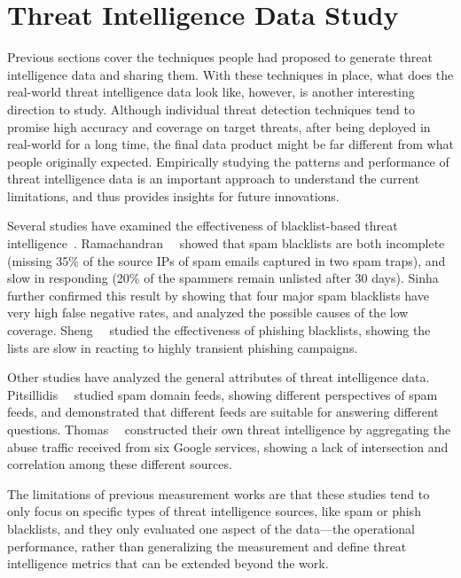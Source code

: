 \section{Threat Intelligence Data Study}
\label{sec:threat_intel_data}

Previous sections cover the techniques people had proposed to generate
threat intelligence data and sharing them. With these 
techniques in place, what does the real-world threat intelligence 
data look like, however, is another interesting direction to study. Although 
individual threat detection techniques tend to promise high accuracy and
coverage on target threats, after being deployed in real-world for a long
time, the final data product might be far different from what 
people originally expected. Empirically studying the patterns and 
performance of threat intelligence data is an important approach to 
understand the current limitations, and thus provides insights for future 
innovations.

Several studies have examined the effectiveness of blacklist-based 
threat intelligence~\cite{kuhrer2014paint, ramachandran2006revealing, 
ramachandran2007filtering, sheng2009empirical, sinha2008shades}.
Ramachandran~\etal~\cite{ramachandran2007filtering} showed that spam 
blacklists are both incomplete (missing 35\% of the source IPs of 
spam emails captured in two spam traps), and slow in responding 
(20\% of the spammers remain unlisted after 30 days).
Sinha~\etal~\cite{sinha2008shades} further confirmed this result by 
showing that four major spam blacklists have very high false negative
rates, and analyzed the possible causes of the low coverage.
Sheng~\etal~\cite{sheng2009empirical} studied the effectiveness of
phishing blacklists, showing the lists are slow in reacting to
highly transient phishing campaigns.

Other studies have analyzed the general attributes of threat
intelligence data. Pitsillidis~\etal~\cite{tasters:imc12} studied
spam domain feeds, showing different perspectives
of spam feeds, and demonstrated that different feeds are suitable for
answering different questions. Thomas~\etal~\cite{thomas2016abuse}
constructed their own threat intelligence by aggregating the abuse
traffic received from six Google services, showing a lack of
intersection and correlation among these different sources. 

The limitations of previous measurement works are that these 
studies tend to only focus on specific types of threat intelligence 
sources, like spam or phish blacklists, and they only evaluated one 
aspect of the data---the operational performance, 
rather than generalizing the measurement and define threat intelligence 
metrics that can be extended beyond the work.

